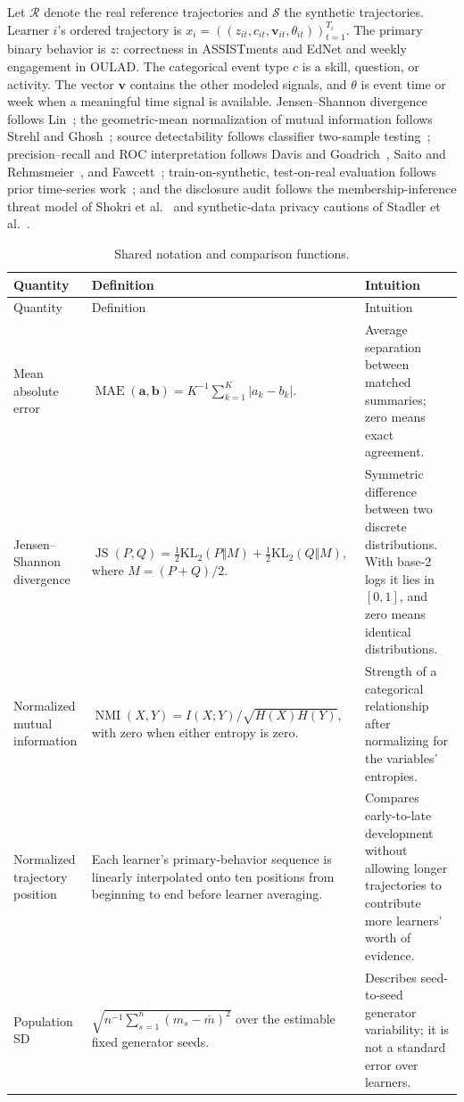 \documentclass[10pt]{article}
\newcommand{\R}{\mathcal{R}}
\newcommand{\SYN}{\mathcal{S}}
\newcommand{\MAE}{\operatorname{MAE}}
\newcommand{\JS}{\operatorname{JS}}
\newcommand{\NMI}{\operatorname{NMI}}
\begin{document}
Let \(\R\) denote the real reference trajectories and \(\SYN\) the synthetic
trajectories.  Learner \(i\)'s ordered trajectory is
\(x_i=((z_{it},c_{it},\mathbf{v}_{it},\theta_{it}))_{t=1}^{T_i}\).  The
primary binary behavior is \(z\): correctness in ASSISTments and EdNet and
weekly engagement in OULAD.  The categorical event type \(c\) is a skill,
question, or activity.  The vector \(\mathbf{v}\) contains the other modeled
signals, and \(\theta\) is event time or week when a meaningful time signal is
available.
Jensen--Shannon divergence follows Lin~\cite{lin1991divergence}; the geometric-mean normalization of mutual information follows Strehl and Ghosh~\cite{strehl2002cluster}; source detectability follows classifier two-sample testing~\cite{lopezpaz2017c2st}; precision--recall and ROC interpretation follows Davis and Goadrich~\cite{davis2006precision}, Saito and Rehmsmeier~\cite{saito2015precision}, and Fawcett~\cite{fawcett2006roc}; train-on-synthetic, test-on-real evaluation follows prior time-series work~\cite{esteban2017realvalued,yoon2019timegan}; and the disclosure audit follows the membership-inference threat model of Shokri et al.~\cite{shokri2017membership} and synthetic-data privacy cautions of Stadler et al.~\cite{stadler2022synthetic}.

\begin{longtable}{@{}p{2.65cm}p{6.15cm}p{6.0cm}@{}}
\caption{Shared notation and comparison functions.}\label{tab:supp-notation}\\
\toprule
Quantity & Definition & Intuition \\
\midrule
\endfirsthead
\toprule
Quantity & Definition & Intuition \\
\midrule
\endhead
\bottomrule
\endlastfoot
Mean absolute error &
\(\MAE(\mathbf a,\mathbf b)=K^{-1}\sum_{k=1}^{K}|a_k-b_k|\). &
Average separation between matched summaries; zero means exact agreement. \\
Jensen--Shannon divergence &
\(\JS(P,Q)=\tfrac12\mathrm{KL}_2(P\Vert M)+\tfrac12\mathrm{KL}_2(Q\Vert M)\), where \(M=(P+Q)/2\). &
Symmetric difference between two discrete distributions.  With base-2 logs it lies in \([0,1]\), and zero means identical distributions. \\
Normalized mutual information &
\(\NMI(X,Y)=I(X;Y)/\sqrt{H(X)H(Y)}\), with zero when either entropy is zero. &
Strength of a categorical relationship after normalizing for the variables' entropies. \\
Normalized trajectory position &
Each learner's primary-behavior sequence is linearly interpolated onto ten positions from beginning to end before learner averaging. &
Compares early-to-late development without allowing longer trajectories to contribute more learners' worth of evidence. \\
Population SD &
\(\sqrt{n^{-1}\sum_{s=1}^{n}(m_s-\bar m)^2}\) over the estimable fixed generator seeds. &
Describes seed-to-seed generator variability; it is not a standard error over learners. \\
\end{longtable}
\end{document}
